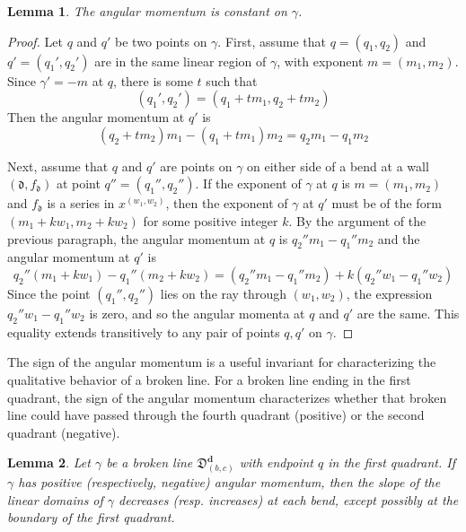 \documentclass[11pt]{amsart}
\newtheorem{lemma}{Lemma}[section]
\theoremstyle{remark}
\numberwithin{equation}{section}
\newcommand{\fd}{\mathfrak{d}}
\begin{document}
\begin{lemma}
The angular momentum is constant on $\gamma$.
\end{lemma}
\begin{proof}
Let $q$ and $q'$ be two points on $\gamma$.
First, assume that $q=(q_1,q_2)$ and $q'=(q_1',q_2')$ are in the same linear region of $\gamma$, with exponent $m=(m_1,m_2)$.  Since $\gamma'=-m$ at $q$, there is some $t$ such that 
\[ (q_1',q_2') = (q_1+tm_1,q_2+tm_2) \]
Then the angular momentum at $q'$ is 
\[ (q_2+tm_2)m_1-(q_1+tm_1)m_2 = q_2m_1 - q_1m_2 \]

Next, assume that $q$ and $q'$ are points on $\gamma$ on either side of a bend at a wall $(\fd, f_{\fd})$ at point $q''=(q_1'',q_2'')$.  If the exponent of $\gamma$ at $q$ is $m=(m_1,m_2)$ and $f_{\fd}$ is a series in $x^{(w_1,w_2)}$, then the exponent of $\gamma$ at $q'$ must be of the form $(m_1+kw_1,m_2+kw_2)$ for some positive integer $k$.  By the argument of the previous paragraph, the angular momentum at $q$ is $q_2''m_1-q_1''m_2$
and the angular momentum at $q'$ is
\[ q_2''(m_1+kw_1)-q_1''(m_2+kw_2) = (q_2''m_1-q_1''m_2)+k(q_2''w_1-q_1''w_2) \]
Since the point $(q_1'',q_2'')$ lies on the ray through $(w_1,w_2)$, the expression $q_2''w_1-q_1''w_2$ is zero, and so the angular momenta at $q$ and $q'$ are the same.  This equality extends transitively to any pair of points $q,q'$ on $\gamma$.
\end{proof}
The sign of the angular momentum is a useful invariant for characterizing the qualitative behavior of a broken line.
For a broken line ending in the first quadrant, the sign of the angular momentum characterizes whether that broken line could have passed through the fourth quadrant (positive) or the second quadrant (negative).

\begin{lemma}
Let $\gamma$ be a broken line $\mathfrak{D}_{(b,c)}^{\mathbf{d}}$ with endpoint $q$ in the first quadrant. If $\gamma$ has positive (respectively, negative) angular momentum, then the slope of the linear domains of $\gamma$ decreases (resp. increases) at each bend, except possibly at the boundary of the first quadrant. 
\end{lemma}
\end{document}
